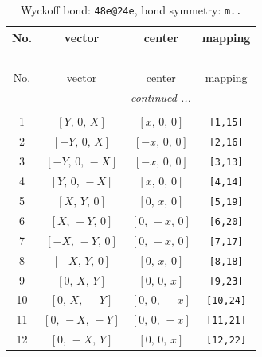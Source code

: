 \documentclass[fleqn,8pt]{jsarticle}
\begin{document}
\begin{longtable}{cccc}
\caption{Wyckoff bond: {\tt 48e@24e}, bond symmetry: {\tt m..}}
 \\
 \hline \hline
No. & vector & center & mapping \\ \hline \endfirsthead

\multicolumn{3}{l}{\tablename\ \thetable{}} \\
 \hline \hline
No. & vector & center & mapping \\ \hline \endhead

 \hline \hline
\multicolumn{3}{r}{\footnotesize\it continued ...} \\ \endfoot

 \hline \hline
\multicolumn{3}{r}{} \\ \endlastfoot

1 & $\left[ Y,\, 0,\, X \right]$ & $\left[ x,\, 0,\, 0 \right]$ & {\tt [1,15]} \\ \hline
2 & $\left[ - Y,\, 0,\, X \right]$ & $\left[ - x,\, 0,\, 0 \right]$ & {\tt [2,16]} \\ \hline
3 & $\left[ - Y,\, 0,\, - X \right]$ & $\left[ - x,\, 0,\, 0 \right]$ & {\tt [3,13]} \\ \hline
4 & $\left[ Y,\, 0,\, - X \right]$ & $\left[ x,\, 0,\, 0 \right]$ & {\tt [4,14]} \\ \hline
5 & $\left[ X,\, Y,\, 0 \right]$ & $\left[ 0,\, x,\, 0 \right]$ & {\tt [5,19]} \\ \hline
6 & $\left[ X,\, - Y,\, 0 \right]$ & $\left[ 0,\, - x,\, 0 \right]$ & {\tt [6,20]} \\ \hline
7 & $\left[ - X,\, - Y,\, 0 \right]$ & $\left[ 0,\, - x,\, 0 \right]$ & {\tt [7,17]} \\ \hline
8 & $\left[ - X,\, Y,\, 0 \right]$ & $\left[ 0,\, x,\, 0 \right]$ & {\tt [8,18]} \\ \hline
9 & $\left[ 0,\, X,\, Y \right]$ & $\left[ 0,\, 0,\, x \right]$ & {\tt [9,23]} \\ \hline
10 & $\left[ 0,\, X,\, - Y \right]$ & $\left[ 0,\, 0,\, - x \right]$ & {\tt [10,24]} \\ \hline
11 & $\left[ 0,\, - X,\, - Y \right]$ & $\left[ 0,\, 0,\, - x \right]$ & {\tt [11,21]} \\ \hline
12 & $\left[ 0,\, - X,\, Y \right]$ & $\left[ 0,\, 0,\, x \right]$ & {\tt [12,22]} \\
\end{longtable}
\renewcommand{\arraystretch}{1.2}
\end{document}
